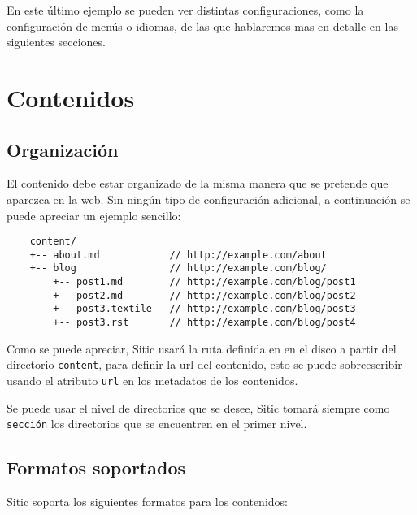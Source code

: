 En este último ejemplo se pueden ver distintas configuraciones, como la configuración de menús o
idiomas, de las que hablaremos mas en detalle en las siguientes secciones.



\section{Contenidos}

\subsection{Organización}

El contenido debe estar organizado de la misma manera que se pretende que aparezca en la web.
Sin ningún tipo de configuración adicional, a continuación se puede apreciar un ejemplo sencillo:

\begin{verbatim}
    content/
    +-- about.md            // http://example.com/about
    +-- blog                // http://example.com/blog/
        +-- post1.md        // http://example.com/blog/post1
        +-- post2.md        // http://example.com/blog/post2
        +-- post3.textile   // http://example.com/blog/post3
        +-- post3.rst       // http://example.com/blog/post4
\end{verbatim}

Como se puede apreciar, Sitic usará la ruta definida en en el disco a partir del directorio \texttt{content},
para definir la url del contenido, esto se puede sobreescribir usando el atributo \texttt{url} en los metadatos
de los contenidos.

Se puede usar el nivel de directorios que se desee, Sitic tomará siempre como \texttt{sección} los
directorios que se encuentren en el primer nivel.

\subsection{Formatos soportados}

Sitic soporta los siguientes formatos para los contenidos:

